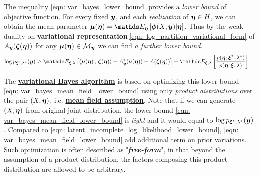 \documentclass[11pt]{article}
\begin{document}
The inequality \eqref{eqn: var_bayes_lower_bound} provides a \emph{lower bound} of objective function. For every fixed $\boldsymbol{y}$, and each \emph{realization} of $\boldsymbol{\eta} \in H$, we can obtain the mean parameter $\mb{\mu}(\mb{\eta}) =  \E{\mb{\eta}}{\mb{\phi}(X, \mb{y})| \mb{\eta}}$. Thus by the weak duality on \textbf{variational representation} \eqref{eqn: log_partition_variational_form} of $A_{\boldsymbol{y}}(\boldsymbol{\zeta}(\boldsymbol{\eta})) $ for any $\boldsymbol{\mu}(\boldsymbol{\eta}) \in {\mathcal M}_{\boldsymbol{y}}$ we can find \emph{a further lower bound}.
\begin{align}
\log p_{\mb{\xi}^{*}, \lambda^{*}}(\mb{y}) &\ge  \E{\mb{\xi}, \lambda}{\inn{\mb{\mu}(\mb{\eta}) }{\mb{\zeta}(\mb{\eta})} - A_{\mb{y}}^{*}(\mb{\mu}(\mb{\eta}) )  - A(\mb{\zeta}(\mb{\eta})) }  + \E{\mb{\xi}, \lambda}{\frac{p(\mb{\eta}; \mb{\xi}^{*}, \lambda^{*})}{p(\mb{\eta}; \mb{\xi}, \lambda)} } \label{eqn: var_bayes_mean_field_lower_bound}
\end{align} 

The \underline{\textbf{variational Bayes algorithm}} is based on optimizing this lower bound  \eqref{eqn: var_bayes_mean_field_lower_bound}  using only \emph{product distributions} over the pair $(X,\boldsymbol{\eta})$, i.e. \underline{\textbf{mean field assumption}}. Note that if we can generate $(X,\boldsymbol{\eta})$ from original joint distribution, the lower bound \eqref{eqn: var_bayes_mean_field_lower_bound} is \emph{tight} and it would equal to $\log p_{\boldsymbol{\xi}^{*}, \lambda^{*}}(\boldsymbol{y})$. Compared to \eqref{eqn: latent_incomplete_log_likelihood_lower_bound}, \eqref{eqn: var_bayes_mean_field_lower_bound} add additional term on prior variations. Such optimization is often described as "\emph{\textbf{free-form}}", in that beyond the assumption of a product distribution, the factors composing this product distribution are allowed to be arbitrary. 
\end{document}

